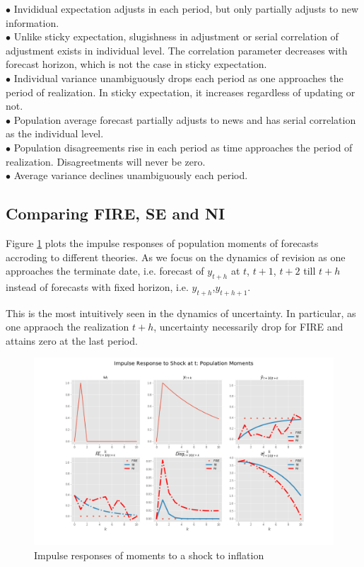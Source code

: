 \documentclass[]{article}
\begin{document}
$\bullet$  Invididual expectation adjusts in each period, but only partially adjusts to new information. \\
$\bullet$ Unlike sticky expectation, slugishness in adjustment or serial correlation of adjustment exists in individual level. The correlation parameter decreases with forecast horizon, which is not the case in sticky expectation.\\
$\bullet$  Individual variance unambiguously drops each period as one approaches the period of realization. In sticky expectation, it increases regardless of updating or not. \\ 
$\bullet$  Population average forecast partially adjusts to news and has serial correlation as the individual level. \\
$\bullet$  Population disagreements rise in each period as time approaches the period of realization. Disagreetments will never be zero. \\
$\bullet$  Average variance declines unambiguously each period. 

\subsection{Comparing FIRE, SE and NI}

Figure \ref{ir_pop} plots the impulse responses of population moments of forecasts accroding to different theories. As we focus on the dynamics of revision as one approaches the terminate date, i.e. forecast of $y_{t+h}$ at $t$, $t+1$, $t+2$ till $t+h$ instead of forecasts with fixed horizon, i.e. $y_{t+h}$,$y_{t+h+1}$. 

This is the most intuitively seen in the dynamics of uncertainty. In particular, as one appraoch the realization $t+h$, uncertainty necessarily drop for FIRE and attains zero at the last period.  

\begin{figure}[ht]
	\centering
	\includegraphics[width=16cm]{figures/ir_popseni.png} 
	\caption{Impulse responses of moments to a shock to inflation}
	\label{ir_pop}
\end{figure}
\end{document}
